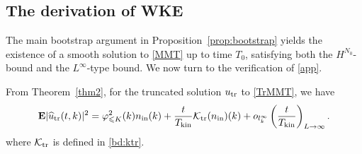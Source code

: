 \documentclass[UTF-8,reqno]{amsart}
\numberwithin{equation}{section}
\newtheorem{proposition}[theorem]{Proposition}
\theoremstyle{definition}
\def\leq{\leqslant}
\def\leq{\leqslant}
\begin{document}
\subsection{The derivation of WKE}\label{sec:mainresult}
The main bootstrap argument in Proposition~\ref{prop:bootstrap} yields the existence of a smooth solution to \eqref{MMT} up to time $T_0$, satisfying both the $H^{N_0}$-bound and the $L^\infty$-type bound. We now turn to the verification of \eqref{app}. 

 From Theorem~\ref{thm2}, for the truncated solution $u_{\rm tr}$ to \eqref{TrMMT}, we have
\begin{equation}
    \mathbf E |\widehat u_{\rm tr}(t, k)|^2 =\varphi^2_{\leq K}(k)n_{\mathrm{in}}(k)+\frac{t}{T_{\mathrm{kin}}}\mathcal K_{\rm tr}(n_{\mathrm{in}})(k)+o_{l^\infty_k}\left(\frac{t}{T_{\mathrm {kin}}}\right)_{L \to \infty}.\notag
\end{equation}
where $\mathcal K_{\rm tr}$ is defined in \eqref{bd:ktr}.

\end{document}
